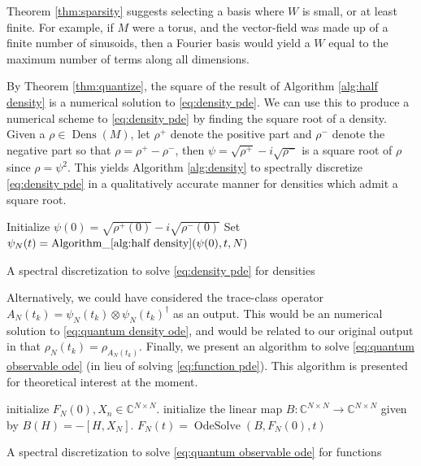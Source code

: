 \documentclass[final,leqno]{siamart}
\DeclareMathOperator{\Dens}{Dens}
\DeclareMathOperator{\OdeSolve}{OdeSolve}
\begin{document}
Theorem \ref{thm:sparsity} suggests selecting a basis where $W$ is small, or at least finite.
For example, if $M$ were a torus, and the vector-field was made up of a finite number of sinusoids, then a Fourier basis would yield a $W$ equal to the maximum number of terms along all dimensions.

By Theorem \ref{thm:quantize}, the square of the result of Algorithm \ref{alg:half density} is a numerical solution to \eqref{eq:density pde}.
We can use this to produce a numerical scheme to \eqref{eq:density pde} by finding the square root of a density.
Given a $\rho \in \Dens(M)$, let $\rho^{+}$ denote the positive part and $\rho^{-}$ denote the negative part so that $\rho = \rho^{+} - \rho^{-}$, 
then $\psi = \sqrt{\rho^{+}} - i \sqrt{\rho^{-}}$ is a square root of $\rho$ since $\rho = \psi^{2}$.
This yields Algorithm \ref{alg:density} to spectrally discretize \eqref{eq:density pde} in a qualitatively accurate manner for densities which admit a square root.

\begin{algorithm}[H] 
	Initialize $\psi(0) =  \sqrt{\rho^{+}(0)} - i \sqrt{\rho^{-}(0)}$\;
	Set $\psi_{N}(t) =  \operatorname{ Algorithm\_ \ref{alg:half density} }( \psi(0) , t, N )$\;
	\caption{A spectral discretization to solve \eqref{eq:density pde} for densities} \label{alg:density}
\end{algorithm}

Alternatively, we could have considered the trace-class operator $A_{N}(t_{k}) = \psi_{N}(t_{k}) \otimes \psi_{N}(t_{k})^{\dagger}$ as an output. 
This would be an numerical solution to \eqref{eq:quantum density ode}, and would be related to our original output in that $\rho_{N}(t_{k}) = \rho_{A_{N}(t_{k})}$.
Finally, we present an algorithm to solve \eqref{eq:quantum observable ode} (in lieu of solving \eqref{eq:function pde}).
This algorithm is presented for theoretical interest at the moment.

\begin{algorithm}[H]
	initialize $F_{N}(0), X_{n} \in \mathbb{C}^{N \times N}$.\;
	initialize the linear map $B: \mathbb{C}^{N \times N} \to \mathbb{C}^{N \times N}$
	given by $B(H) = - [H , X_{N}]$.\;
	$F_{N}(t) = \OdeSolve( B , F_{N}(0) , t)$\;	
	\caption{A spectral discretization to solve \eqref{eq:quantum observable ode} for functions} \label{alg:function}
\end{algorithm}
\end{document}

